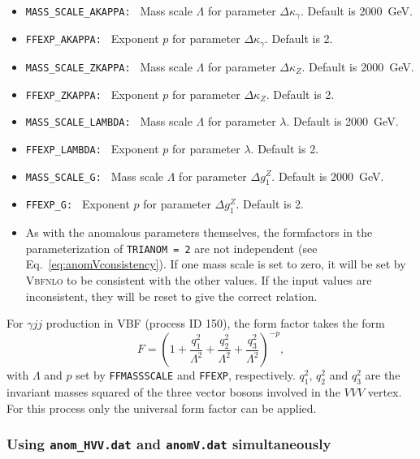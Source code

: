 \documentclass[english,12pt]{article}
\begin{document}
\begin{itemize}
 \item {\tt MASS\_SCALE\_AKAPPA: } Mass scale $\Lambda$ for parameter $\Delta
\kappa_{\gamma}$.  Default is 2000~GeV.
 \item {\tt FFEXP\_AKAPPA: } Exponent $p$ for parameter $\Delta \kappa_{\gamma}$.  Default
is 2.
 \item {\tt MASS\_SCALE\_ZKAPPA: } Mass scale $\Lambda$ for parameter $\Delta
\kappa_{Z}$.  Default is 2000~GeV.
 \item {\tt FFEXP\_ZKAPPA: } Exponent $p$ for parameter $\Delta \kappa_{Z}$.  Default
is 2.
 \item {\tt MASS\_SCALE\_LAMBDA: } Mass scale $\Lambda$ for parameter $\lambda$.
 Default is 2000~GeV.
 \item {\tt FFEXP\_LAMBDA: } Exponent $p$ for parameter $\lambda$.  Default is
2.
 \item {\tt MASS\_SCALE\_G: } Mass scale $\Lambda$ for parameter $\Delta g_{1}^{Z}$. 
Default is 2000~GeV.
 \item {\tt FFEXP\_G: } Exponent $p$ for parameter $\Delta g_{1}^{Z}$.  Default is 2.
 \item As with the anomalous parameters themselves, the formfactors in the
parameterization of {\tt TRIANOM = 2} are not independent (see
Eq.~\eqref{eq:anomVconsistency}).  If one mass scale is set to zero, it will be
set by \textsc{Vbfnlo} to be consistent with the other values.  If the input
values are inconsistent, they will be reset to give the correct relation.
\end{itemize}

For $\gamma jj$ production in VBF (process ID 150), the form factor takes the form
\begin{equation}
 F = \left(1 + \frac{q_1^2}{\Lambda^{2}} + \frac{q_2^2}{\Lambda^{2}} + \frac{q_3^2}{\Lambda^{2}} \right)^{-p},
\end{equation}
with $\Lambda$ and $p$ set by {\tt FFMASSSCALE} and {\tt FFEXP}, respectively.
$q_1^2$, $q_2^2$ and $q_3^2$ are the invariant masses squared of the three vector bosons involved in the
$VVV$ vertex.
For this process only the universal form factor can be applied.



\subsubsection{Using {\tt anom\_HVV.dat} and {\tt anomV.dat} simultaneously}
\label{sec:HVVandVVV}
\end{document}
